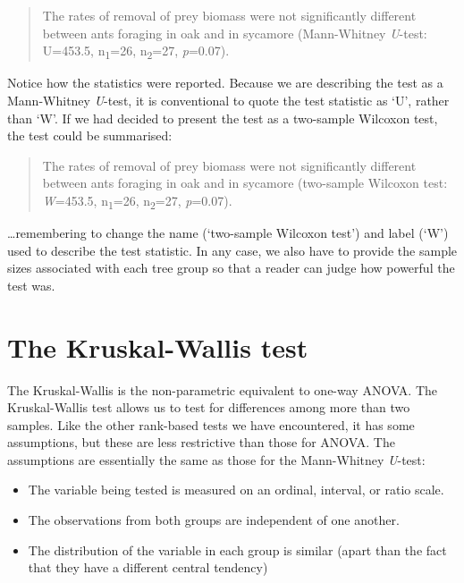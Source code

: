 \documentclass[
]{book}
\begin{document}
\begin{quote}
The rates of removal of prey biomass were not significantly different between ants foraging in oak and in sycamore (Mann-Whitney \emph{U}-test: U=453.5, n\textsubscript{1}=26, n\textsubscript{2}=27, \emph{p}=0.07).
\end{quote}

Notice how the statistics were reported. Because we are describing the test as a Mann-Whitney \emph{U}-test, it is conventional to quote the test statistic as `U', rather than `W'. If we had decided to present the test as a two-sample Wilcoxon test, the test could be summarised:

\begin{quote}
The rates of removal of prey biomass were not significantly different between ants foraging in oak and in sycamore (two-sample Wilcoxon test: \emph{W}=453.5, n\textsubscript{1}=26, n\textsubscript{2}=27, \emph{p}=0.07).
\end{quote}

\ldots remembering to change the name (`two-sample Wilcoxon test') and label (`W') used to describe the test statistic. In any case, we also have to provide the sample sizes associated with each tree group so that a reader can judge how powerful the test was.

\hypertarget{the-kruskal-wallis-test}{%
\section{The Kruskal-Wallis test}\label{the-kruskal-wallis-test}}

The Kruskal-Wallis is the non-parametric equivalent to one-way ANOVA. The Kruskal-Wallis test allows us to test for differences among more than two samples. Like the other rank-based tests we have encountered, it has some assumptions, but these are less restrictive than those for ANOVA. The assumptions are essentially the same as those for the Mann-Whitney \emph{U}-test:

\begin{itemize}
\item
  The variable being tested is measured on an ordinal, interval, or ratio scale.
\item
  The observations from both groups are independent of one another.
\item
  The distribution of the variable in each group is similar (apart than the fact that they have a different central tendency)
\end{itemize}
\end{document}
